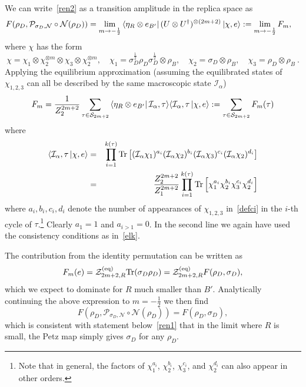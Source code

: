 \documentclass[a4paper,11pt]{article}
\newcommand\half{{\ensuremath{\frac{1}{2}}}}
\newcommand{\be}{\begin{equation}}
\newcommand{\ee}{\end{equation}}
\newcommand{\bea}{\begin{eqnarray}}
\newcommand{\eea}{\end{eqnarray}}
\newcommand\al{{\alpha}}
\newcommand\sig{\sigma}
\newcommand\ov{\over}
\newcommand\ha{{\half}}
\def\le{\left}
\def\ri{\right}
\newcommand\sI{{\ensuremath{{\mathcal I}}}}
\newcommand\sZ{{\mathcal Z}}
\newcommand{\Tr}{\text{Tr}}
\begin{document}
We can write~\eqref{ren2} as a transition amplitude in the replica space as
\begin{align}
 F(\rho_D, \mathcal{P}_{\sigma_D, \mathcal{N}}\circ \mathcal{N}(\rho_D)) &= \lim_{m\rightarrow -\frac{1}{2}} \bra{\eta_{{R}} \otimes e_{B'}} (U\otimes U^{\dagger})^{\otimes (2m+2)}\ket{\chi,e} := \lim_{m\rightarrow -\frac{1}{2}}F_m , \label{f_limit}
\end{align}
where $\chi$ has the form 
\be \label{defci}
\chi =\chi_1 \otimes \chi_2^{\otimes m} \otimes \chi_3 \otimes \chi_2^{\otimes m} , 
\quad \chi_1 = \sigma_D^{\frac{1}{2}}\rho_D\sigma_D^{\frac{1}{2}} \otimes \rho_B, 
\quad \chi_2 = \sig_D \otimes \rho_B, \quad \chi_3 = \rho_D \otimes \rho_B \ . 
\ee
Applying the equilibrium approximation (assuming the equilibrated states of $\chi_{1,2,3}$ can all be described by the same macroscopic state $\sI_\al$) 
\begin{align} 
 F_m = \frac{1}{Z_2^{2m+2}}\sum_{\tau \in \mathcal{S}_{2m +2}} \bra{\eta_{{R}} \otimes e_{B'}} \mathcal{I}_{\alpha},\tau\rangle \langle \mathcal{I}_{\alpha} ,\tau\ket{\chi,e} := \sum_{\tau \in \mathcal{S}_{2m +2}} F_m (\tau) \label{fm_tau}
\end{align}
where 
\bea \label{i_chi}
\langle \mathcal{I}_{\alpha} ,\tau\ket{\chi,e} &= & \prod_{i=1}^{k (\tau)}
\Tr \le[ (\sI_\al \chi_1)^{a_i} (\sI_\al \chi_2)^{b_i} (\sI_\al \chi_3)^{c_i} (\sI_\al \chi_2)^{d_i} \ri] \\
& = & {Z_2^{2m+2} \ov Z_1^{2m+2}} \prod_{i=1}^{k (\tau)}
\Tr \le[ \chi_1^{a_i} \chi_2^{b_i} \chi_3^{c_i} \chi_2^{d_i} \ri]
\eea
where $a_i, b_i, c_i, d_i$ denote the number of appearances of $\chi_{1,2,3}$ in~\eqref{defci} in the $i$-th cycle of $\tau$.\footnote{Note that in general, the factors of $\chi_1^{a_i}$, $\chi_2^{b_i}$, $\chi_3^{c_i}$, and $\chi_2^{d_i}$ can also appear in other orders.} Clearly $a_1 =1$ and $a_{i > 1} =0$. In the second line we again have used the consistency conditions as in~\eqref{elk}. 

The contribution from the identity permutation can be written 
 as 
 \be 
 F_m (e) = \sZ_{2m+2, R}^{(\rm eq)} \Tr (\sig_D \rho_D) = \sZ_{2m+2, R}^{(\rm eq)} F(\rho_D, \sig_D) , 
 \ee
 which we expect to dominate for $R$ much smaller than $B'$. Analytically continuing the above expression to $m =-\ha$ we then find 
 \be
 F(\rho_D, \mathcal{P}_{\sigma_D, \mathcal{N}}\circ \mathcal{N}(\rho_D)) = F(\rho_D, \sig_D) ,
 \ee
 which is consistent with statement below~\eqref{ren1} that in the limit where $R$ is small, the Petz map simply gives $\sig_D$ for any $\rho_D$. 
 
\end{document}
